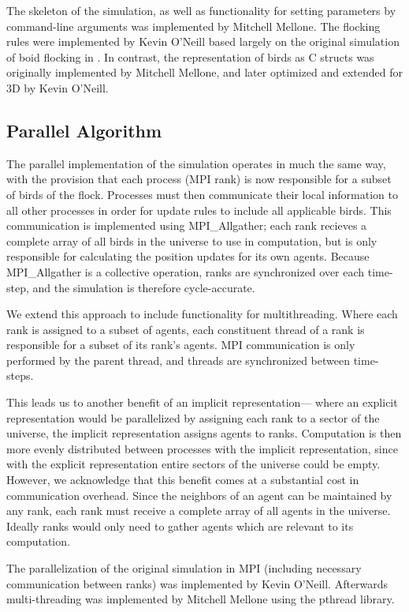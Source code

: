 The skeleton of the simulation, as well as functionality for setting
parameters by command-line arguments was implemented by Mitchell
Mellone.  The flocking rules were implemented by Kevin O'Neill based
largely on the original simulation of boid flocking in
\cite{Reynolds}. In contrast, the representation of birds as C structs
was originally implemented by Mitchell Mellone, and later optimized
and extended for 3D by Kevin O'Neill.

\subsection*{Parallel Algorithm}
The parallel implementation of the simulation operates in much the
same way, with the provision that each process (MPI rank) is now
responsible for a subset of birds of the flock. Processes must then
communicate their local information to all other processes in order
for update rules to include all applicable birds. This communication
is implemented using MPI\_Allgather; each rank recieves a complete
array of all birds in the universe to use in computation, but is only
responsible for calculating the position updates for its own agents.
Because MPI\_Allgather is a collective operation, ranks are
synchronized over each time-step, and the simulation is therefore
cycle-accurate.

We extend this approach to include functionality for
multithreading. Where each rank is assigned to a subset of agents,
each constituent thread of a rank is responsible for a subset of
its rank's agents. MPI communication is only performed by the parent
thread, and threads are synchronized between time-steps.

This leads us to another benefit of an implicit representation---
where an explicit representation would be parallelized by assigning
each rank to a sector of the universe, the implicit representation
assigns agents to ranks. Computation is then more evenly distributed
between processes with the implicit representation, since with the
explicit representation entire sectors of the universe could be
empty. However, we acknowledge that this benefit comes at a
substantial cost in communication overhead. Since the neighbors of an
agent can be maintained by any rank, each rank must receive a complete
array of all agents in the universe. Ideally ranks would only need to
gather agents which are relevant to its computation.

The parallelization of the original simulation in MPI (including
necessary communication between ranks) was implemented by Kevin
O'Neill. Afterwards multi-threading was implemented by Mitchell
Mellone using the pthread library.

